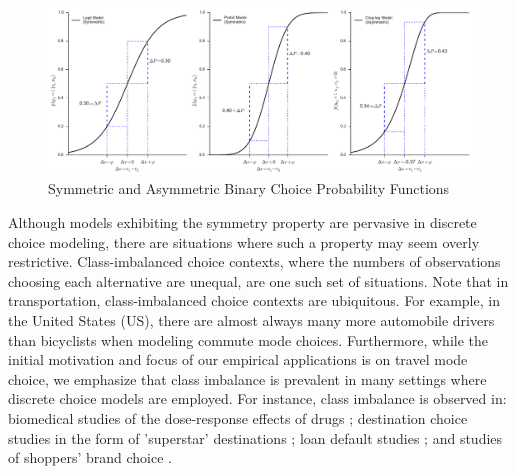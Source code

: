 \begin{figure}
\centering
\includegraphics[width=\textwidth]{chapter3/images/Fig1_600dpi}
\caption{Symmetric and Asymmetric Binary Choice Probability Functions}
\label{fig:symm_logit_probit}
\end{figure}

Although models exhibiting the symmetry property are pervasive in discrete choice modeling, there are situations where such a property may seem overly restrictive. Class-imbalanced choice contexts, where the numbers of observations choosing each alternative are unequal, are one such set of situations. Note that in transportation, class-imbalanced choice contexts are ubiquitous. For example, in the United States (US), there are almost always many more automobile drivers than bicyclists when modeling commute mode choices. Furthermore, while the initial motivation and focus of our empirical applications is on travel mode choice, we emphasize that class imbalance is prevalent in many settings where discrete choice models are employed. For instance, class imbalance is observed in: biomedical studies of the dose-response effects of drugs \citep{pregibon_goodness_1980}; destination choice studies in the form of 'superstar' destinations \citep{chorus_paving_2016}; loan default studies \citep{calabrese_modelling_2013}; and studies of shoppers' brand choice \citep{briesch_semiparametric_2002}.

